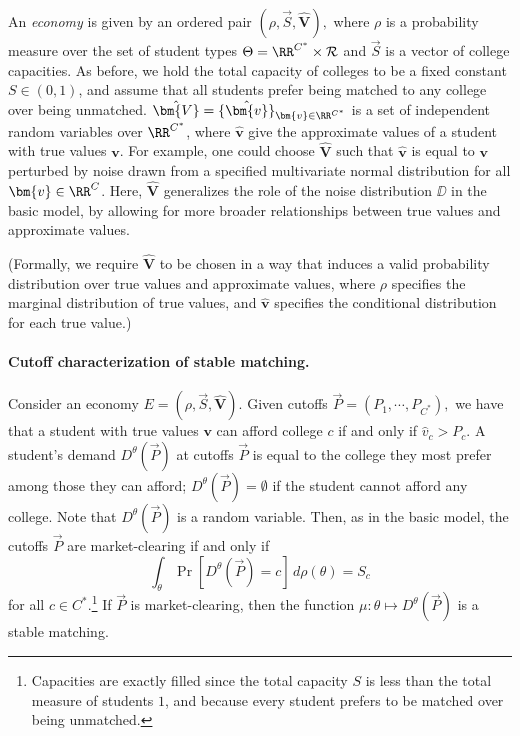 \documentclass[10pt]{article}
\begin{document}
\begin{ReviewVerbatim}
An \textit{economy} is given by an ordered pair $(\rho, \vec{S}, \hat{\bm{V}}),$ where $\rho$ is a probability measure over the set of student types $\Theta = \RR^{C^*}\times \mathcal{R}$ and $\vec{S}$ is a vector of college capacities. As before, we hold the total capacity of colleges to be a fixed constant $S\in (0,1)$, and assume that all students prefer being matched to any college over being unmatched. $\hat{\bm{V}} = \{\hat{\bm{v}}\}_{\bm{v}\in \RR^{C^*}}$ is a set of independent random variables over $\RR^{C^*}$, where $\hat{\bm{v}}$ give the approximate values of a student with true values $\bm{v}$. For example, one could choose $\hat{\bm{V}}$ such that $\hat{\bm{v}}$ is equal to $\bm{v}$ perturbed by noise drawn from a specified multivariate normal distribution for all $\bm{v}\in \RR^C$. Here, $\hat{\bm{V}}$ generalizes the role of the noise distribution $\DD$ in the basic model, by allowing for more broader relationships between true values and approximate values.

(Formally, we require $\hat{\bm{V}}$ to be chosen in a way that induces a valid probability distribution over true values and approximate values, where $\rho$ specifies the marginal distribution of true values, and $\hat{\bm{v}}$ specifies the conditional distribution for each true value.)

\paragraph{Cutoff characterization of stable matching.}
Consider an economy $E=(\rho, \vec{S}, \hat{\bm{V}}).$ Given cutoffs $\vec{P} = (P_1, \cdots, P_{C^*}),$ we have that a student with true values $\bm{v}$ can afford college $c$ if and only if $\hat{v}_c > P_c$. A student's demand $D^{\theta}(\vec{P})$ at cutoffs $\vec{P}$ is equal to the college they most prefer among those they can afford; $D^{\theta}(\vec{P})=\emptyset$ if the student cannot afford any college. Note that $D^{\theta}(\vec{P})$ is a random variable. Then, as in the basic model, the cutoffs $\vec{P}$ are market-clearing if and only if
\begin{equation}
    \int_{\theta} \Pr[D^{\theta}(\vec{P})=c]\,d\rho(\theta) = S_c
\end{equation}
for all $c\in {C^*}$.\footnote{Capacities are exactly filled since the total capacity $S$ is less than the total measure of students $1$, and because every student prefers to be matched over being unmatched.} If $\vec{P}$ is market-clearing, then the function $\mu:\theta\mapsto D^{\theta}(\vec{P})$ is a stable matching.


\end{ReviewVerbatim}
\end{document}
